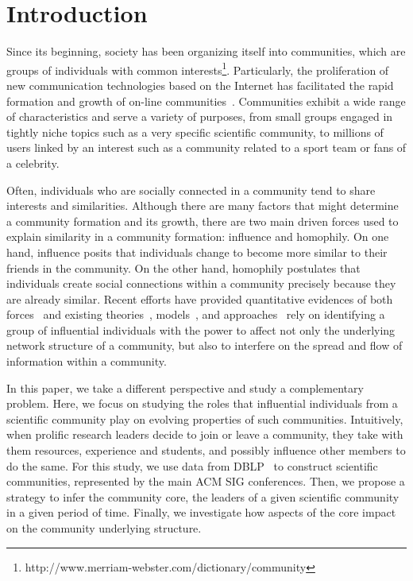\section{Introduction}

Since its beginning, society has been organizing itself into communities, which are groups of individuals with common interests\footnote{http://www.merriam-webster.com/dictionary/community}.
Particularly, the proliferation of new communication technologies based on the Internet has facilitated the rapid formation and growth of on-line communities~\cite{Kleinberg@cacm2008}. 
Communities exhibit a wide range of characteristics and serve a variety of purposes, from small groups engaged in tightly niche topics such as a very specific scientific community, 
to millions of users linked by an interest such as a community related to a sport team or fans of a celebrity. 

Often, individuals who are socially connected in a community tend to share interests and similarities. Although there are many factors that might determine a community formation
and its growth, there are two main driven forces used to explain similarity in a community formation: influence and homophily. On one hand, influence posits that individuals change
to become more similar to their friends in the community. On the other hand, homophily postulates that individuals create social connections within a community precisely because
they are already similar. Recent efforts have provided quantitative evidences of both forces~\cite{icwsm10cha,crandall.kdd08,Backstrom:2006,influence.correlation.kdd08} and
existing theories~\cite{Rogers.1962,accidental-influential}, models~\cite{kempe03kdd,Kempe05influentialnodes}, and
approaches~\cite{saez-trumper@kdd12,Weng:2010:TFT:1718487.1718520} rely on identifying a group of influential individuals with the power to affect not only the underlying network
structure of a community, but also to interfere on the spread and flow of information within a community. 

In this paper, we take a different perspective and study a complementary problem. Here, we focus on studying the roles that influential individuals from a scientific community play
on evolving properties of such communities. Intuitively, when prolific research leaders decide to join or leave a community, they take with them resources,
experience and students, and possibly influence other members to do the same. For this study, we use data from DBLP~\cite{Ley:2009} to construct scientific communities, represented by the 
main ACM SIG conferences. Then, we propose a strategy to infer the community core, the leaders of a given scientific community in a given period of time. 
Finally, we investigate how aspects of the core impact on the community underlying structure. 

